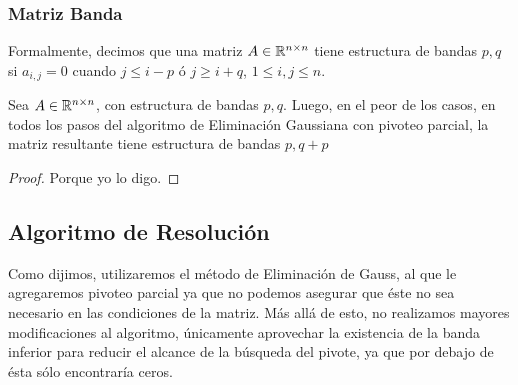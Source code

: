 \subsubsection{Matriz Banda}
Formalmente, decimos que una matriz $A \in \mathbb{R} ^{n\times n}$ tiene estructura de bandas $p,q$ si $a_{i,j} = 0$ cuando $j \leq i-p$ ó $j\geq i+q$, $1\leq i,j \leq n$.

\begin{lema}
Sea $A \in \mathbb{R}^{n \times n}$, con estructura de bandas $p, q$. Luego, en el peor de los casos, en todos los pasos del algoritmo de Eliminación Gaussiana con pivoteo parcial, la matriz resultante tiene estructura de bandas $p, q+p$
\end{lema}
\begin{proof}
Porque yo lo digo.
\end{proof}

\subsection{Algoritmo de Resolución}
Como dijimos, utilizaremos el método de Eliminación de Gauss, al que le agregaremos pivoteo parcial  ya que no podemos asegurar que éste no sea necesario en las condiciones de la matriz. Más allá de esto, no realizamos mayores modificaciones al algoritmo, únicamente aprovechar la existencia de la banda inferior para reducir el alcance de la búsqueda del pivote, ya que por debajo de ésta sólo encontraría ceros.




